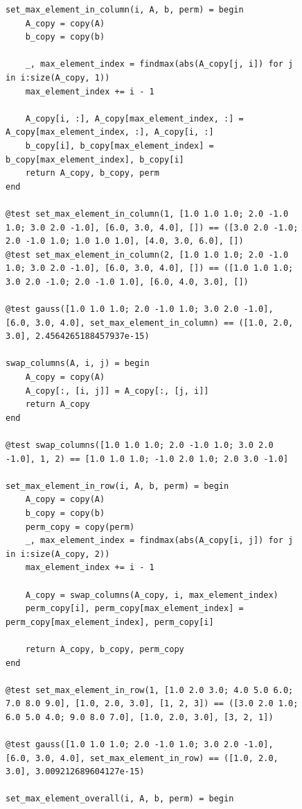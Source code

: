 \documentclass[a4paper, 14pt]{extarticle}
\begin{document}
\begin{figure}[!htb]
\begin{lstlisting}[language={},caption={Метод Гаусса (продолжение)},label={lst:code3}]
set_max_element_in_column(i, A, b, perm) = begin
    A_copy = copy(A)
    b_copy = copy(b)

    _, max_element_index = findmax(abs(A_copy[j, i]) for j in i:size(A_copy, 1))
    max_element_index += i - 1

    A_copy[i, :], A_copy[max_element_index, :] = A_copy[max_element_index, :], A_copy[i, :]
    b_copy[i], b_copy[max_element_index] = b_copy[max_element_index], b_copy[i]
    return A_copy, b_copy, perm
end

@test set_max_element_in_column(1, [1.0 1.0 1.0; 2.0 -1.0 1.0; 3.0 2.0 -1.0], [6.0, 3.0, 4.0], []) == ([3.0 2.0 -1.0; 2.0 -1.0 1.0; 1.0 1.0 1.0], [4.0, 3.0, 6.0], [])
@test set_max_element_in_column(2, [1.0 1.0 1.0; 2.0 -1.0 1.0; 3.0 2.0 -1.0], [6.0, 3.0, 4.0], []) == ([1.0 1.0 1.0; 3.0 2.0 -1.0; 2.0 -1.0 1.0], [6.0, 4.0, 3.0], [])

@test gauss([1.0 1.0 1.0; 2.0 -1.0 1.0; 3.0 2.0 -1.0], [6.0, 3.0, 4.0], set_max_element_in_column) == ([1.0, 2.0, 3.0], 2.4564265188457937e-15)

swap_columns(A, i, j) = begin
    A_copy = copy(A)
    A_copy[:, [i, j]] = A_copy[:, [j, i]]
    return A_copy
end

@test swap_columns([1.0 1.0 1.0; 2.0 -1.0 1.0; 3.0 2.0 -1.0], 1, 2) == [1.0 1.0 1.0; -1.0 2.0 1.0; 2.0 3.0 -1.0]

set_max_element_in_row(i, A, b, perm) = begin
    A_copy = copy(A)
    b_copy = copy(b)
    perm_copy = copy(perm)
    _, max_element_index = findmax(abs(A_copy[i, j]) for j in i:size(A_copy, 2))
    max_element_index += i - 1

    A_copy = swap_columns(A_copy, i, max_element_index)
    perm_copy[i], perm_copy[max_element_index] = perm_copy[max_element_index], perm_copy[i]

    return A_copy, b_copy, perm_copy
end

@test set_max_element_in_row(1, [1.0 2.0 3.0; 4.0 5.0 6.0; 7.0 8.0 9.0], [1.0, 2.0, 3.0], [1, 2, 3]) == ([3.0 2.0 1.0; 6.0 5.0 4.0; 9.0 8.0 7.0], [1.0, 2.0, 3.0], [3, 2, 1])

@test gauss([1.0 1.0 1.0; 2.0 -1.0 1.0; 3.0 2.0 -1.0], [6.0, 3.0, 4.0], set_max_element_in_row) == ([1.0, 2.0, 3.0], 3.009212689604127e-15)

set_max_element_overall(i, A, b, perm) = begin
\end{lstlisting}
\end{figure}
\end{document}
